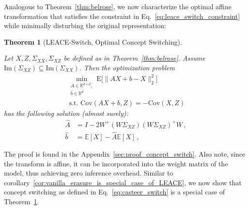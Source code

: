 \documentclass{article}
\theoremstyle{plain}
\newtheorem{theorem}{Theorem}[section]
\theoremstyle{definition}
\theoremstyle{remark}
\newcommand{\cov}{\mathrm{Cov}}
\newcommand{\ili}[1]{\textbf{[Ili]}  \; {\color{blue}#1}}
\begin{document}
Analogous to Theorem~\ref{thm:belrose}, we now characterize the optimal affine transformation that satisfies the constraint in Eq.~\ref{eq:leace_switch_constraint} while minimally disturbing the original representation:
\begin{theorem}[LEACE-Switch, Optimal Concept Switching]

\label{thm:concept_switch}

Let $X, Z, \Sigma_{XX}, \Sigma_{XZ}$ be defined as in Theorem~\ref{thm:belrose}. Assume $\mathrm{Im}(\Sigma_{XZ}) \subseteq \mathrm{Im}(\Sigma_{XX})$.
Then the optimization problem
\begin{align}
    \label{eq:concept_switch_minimization}
    \min_{\substack{
        A \in \mathbb{R}^{d \times d},
        \\ b \in \mathbb{R}^d
    }} \mathrm{E}\Big[ \lVert{ A X + b - X}\rVert_2^2 \Big] \\
    \text{ s.t. } \cov(AX + b, Z) = -\cov(X, Z)
\end{align}
has the following solution (almost surely):
\begin{align}
    \label{eq:concept_switch_optimum_A}
    \widehat{A} &= I - 2W^+(W \Sigma_{XZ}) (W \Sigma_{XZ})^+ W \, ,\\
    \label{eq:concept_switch_optimum_b}
    \widehat{b} &= \mathbb{E}[X] - \widehat{A} \mathbb{E}[X] \, ,
\end{align}
\end{theorem}
The proof is found in the Appendix~\ref{sec:proof_concept_switch}. Also note, since the transform is affine, it can be incorporated into the weight matrix of the model, thus achieving zero inference overhead.
%
Similar to corollary~\ref{cor:vanilla_erasure_is_special_case_of_LEACE}, we now show that concept switching as defined in Eq.~\ref{eq:casteer_switch} is a special case of Theorem~\ref{thm:concept_switch}. 
\end{document}
